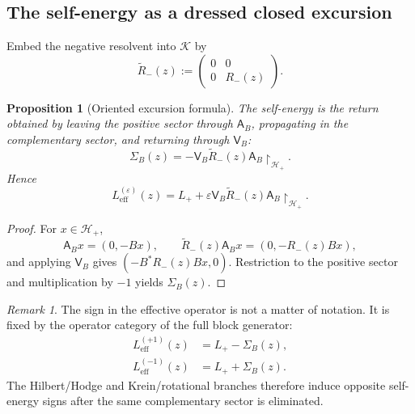 \documentclass[11pt,reqno]{scrartcl}
\newcommand{\scrK}{\mathscr K}
\newcommand{\scrHp}{\mathscr H_{+}}
\newcommand{\Aop}{\mathsf A}
\newcommand{\Vop}{\mathsf V}
\newcommand{\restr}[2]{#1\!\upharpoonright_{#2}}
\theoremstyle{plain}
\newtheorem{proposition}[proposition]{Proposition}
\theoremstyle{definition}
\theoremstyle{remark}
\newtheorem{remark}[remark]{Remark}
\begin{document}
\subsection{The self-energy as a dressed closed excursion}

Embed the negative resolvent into \(\scrK\) by
\begin{equation}
  \widetilde R_-(z):=
  \begin{pmatrix}
    0&0\\
    0&R_-(z)
  \end{pmatrix}.
  \label{eq:embedded-resolvent}
\end{equation}

\begin{proposition}[Oriented excursion formula]
\label{prop:oriented-self-energy}
The self-energy is the return obtained by leaving the positive sector through
\(\Aop_B\), propagating in the complementary sector, and returning through
\(\Vop_B\):
\begin{equation}
  \boxed{
  \Sigma_B(z)
  =-\restr{\Vop_B\widetilde R_-(z)\Aop_B}{\scrHp}.}
  \label{eq:self-energy-AV}
\end{equation}
Hence
\begin{equation}
  L_{\mathrm{eff}}^{(\varepsilon)}(z)
  =L_++\varepsilon
  \restr{\Vop_B\widetilde R_-(z)\Aop_B}{\scrHp}.
  \label{eq:effective-AV}
\end{equation}
\end{proposition}

\begin{proof}
For \(x\in\scrHp\),
\begin{equation}
  \Aop_Bx=(0,-Bx),
  \qquad
  \widetilde R_-(z)\Aop_Bx=(0,-R_-(z)Bx),
\end{equation}
and applying \(\Vop_B\) gives
\((-B^*R_-(z)Bx,0)\).  Restriction to the positive sector and multiplication
by \(-1\) yields \(\Sigma_B(z)\).
\end{proof}

\begin{remark}
The sign in the effective operator is not a matter of notation.  It is fixed
by the operator category of the full block generator:
\begin{align}
  L_{\mathrm{eff}}^{(+1)}(z)
  &=L_+-\Sigma_B(z),
  \label{eq:Leff-plus}\\
  L_{\mathrm{eff}}^{(-1)}(z)
  &=L_++\Sigma_B(z).
  \label{eq:Leff-minus}
\end{align}
The Hilbert/Hodge and Krein/rotational branches therefore induce opposite
self-energy signs after the same complementary sector is eliminated.
\end{remark}
\end{document}
